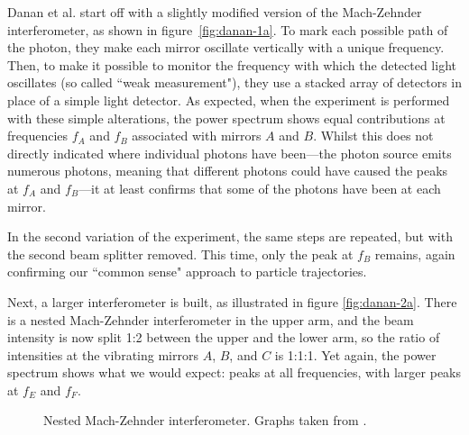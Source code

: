 \documentclass{article}
\begin{document}
Danan et al. start off with a slightly modified version of the Mach-Zehnder 
interferometer, as shown in figure~\ref{fig:danan-1a}\cite{danan}. To mark each 
possible path of the photon, they make each mirror oscillate vertically with a 
unique frequency. Then, to make it possible to monitor the frequency with which 
the detected light oscillates (so called ``weak 
measurement"\cite{aharonov2008,danan}), they use a stacked array of detectors 
in place of a simple light detector. As expected, when the experiment is 
performed with these simple alterations, the power spectrum shows equal 
contributions at frequencies $f_A$ and $f_B$ associated with mirrors $A$ and 
$B$. Whilst this does not directly indicated where individual photons have 
been---the photon source emits numerous photons, meaning that different photons 
could have caused the peaks at $f_A$ and $f_B$---it at least confirms that some 
of the photons have been at each mirror\cite{danan}. 

In the second variation of the experiment, the same steps are repeated, but 
with the second beam splitter removed\cite{danan}. This time, only the peak at 
$f_B$ remains, again confirming our ``common sense" approach to particle 
trajectories. 

Next, a larger interferometer is built, as illustrated in figure 
\ref{fig:danan-2a}\cite{danan}. There is a nested Mach-Zehnder interferometer 
in the upper arm, and the beam intensity is now split 1:2 between the upper and 
the lower arm, so the ratio of intensities at the vibrating mirrors $A$, $B$, 
and $C$ is 1:1:1.  Yet again, the power spectrum shows what we would expect: 
peaks at all frequencies, with larger peaks at $f_E$ and $f_F$. 

 \begin{figure}
	\subfloat[]{\label{fig:danan-2a}}
	\subfloat[]{\label{fig:danan-2b}}
	\newline
	\hspace*{\fill}
	\subfloat[]{\label{fig:danan-2c}}
	\hspace*{\fill}
	 \caption{Nested Mach-Zehnder interferometer. Graphs taken from 
	 \cite{danan}.}
	\label{fig:danan}
\end{figure}
\end{document}
